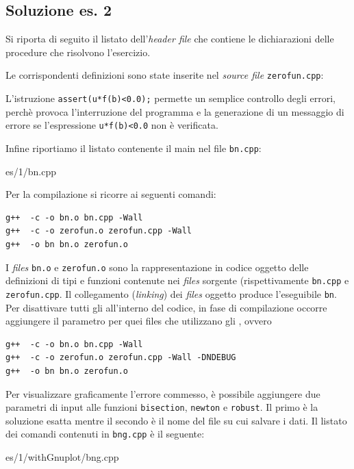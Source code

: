 \subsection*{Soluzione es. 2}

Si riporta di seguito il listato dell'\emph{header file} che contiene
le dichiarazioni delle procedure che risolvono l'esercizio.
\lstset{basicstyle=\scriptsize\sf}
    
\lstset{basicstyle=\sf}

Le corrispondenti definizioni sono state inserite nel \emph{source file}
\texttt{zerofun.cpp}:
\lstset{basicstyle=\scriptsize\sf}
    
\lstset{basicstyle=\sf}

L'istruzione \texttt{assert(u*f(b)<0.0);} permette un semplice controllo degli errori,
perch\`e provoca l'interruzione del programma e la generazione di un
messaggio di errore se l'espressione \texttt{u*f(b)<0.0} non \`e verificata.

Infine riportiamo il listato contenente il main nel file \texttt{bn.cpp}:
\lstset{basicstyle=\scriptsize\sf}
    
    {es/1/bn.cpp}
\lstset{basicstyle=\sf}

Per la compilazione si ricorre ai seguenti comandi:
\begin{verbatim}
g++  -c -o bn.o bn.cpp -Wall
g++  -c -o zerofun.o zerofun.cpp -Wall
g++  -o bn bn.o zerofun.o
\end{verbatim}

I \emph{files} \texttt{bn.o} e \texttt{zerofun.o} sono la
rappresentazione in codice oggetto delle definizioni di tipi e
funzioni contenute nei \emph{files} sorgente
(rispettivamente \texttt{bn.cpp} e \texttt{zerofun.cpp}.
Il collegamento (\emph{linking}) dei \emph{files} oggetto
produce l'eseguibile \texttt{bn}.
Per disattivare tutti gli  all'interno del codice,
in fase di compilazione occorre aggiungere il parametro 
per quei files che utilizzano gli , ovvero
\begin{verbatim}
g++  -c -o bn.o bn.cpp -Wall
g++  -c -o zerofun.o zerofun.cpp -Wall -DNDEBUG
g++  -o bn bn.o zerofun.o
\end{verbatim}

Per visualizzare graficamente l'errore commesso, \`e possibile
aggiungere due parametri di input alle funzioni \texttt{bisection},
\texttt{newton} e \texttt{robust}.
Il primo \`e la soluzione esatta mentre il secondo \`e il nome del
file su cui salvare i dati.
Il listato dei comandi contenuti in \texttt{bng.cpp} \`e il seguente:
\lstset{basicstyle=\scriptsize\sf}
    
        {es/1/withGnuplot/bng.cpp}
\lstset{basicstyle=\sf}

